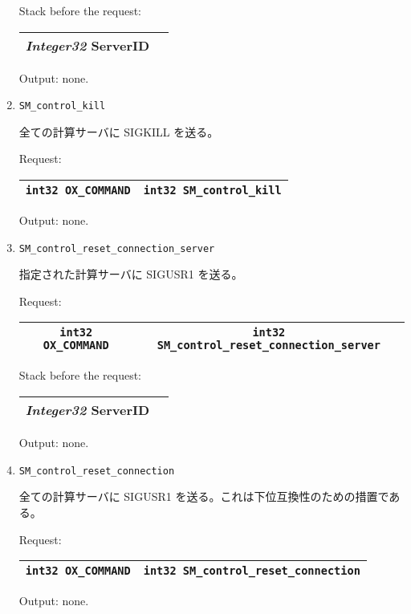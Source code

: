 \documentclass{article}
\begin{document}
\begin{enumerate}
Stack before the request:
\begin{tabular}{|c|c|}  \hline
{\sl Integer32} ServerID \\
\hline
\end{tabular}

Output: none.

\item
\begin{verbatim}
SM_control_kill
\end{verbatim}
全ての計算サーバに SIGKILL を送る。

Request:
\begin{tabular}{|c|c|}  \hline
{\tt int32 OX\_COMMAND} & {\tt int32 SM\_control\_kill}  \\
\hline
\end{tabular}

Output: none.

\item
\begin{verbatim}
SM_control_reset_connection_server
\end{verbatim}
指定された計算サーバに SIGUSR1 を送る。

Request:
\begin{tabular}{|c|c|}  \hline
{\tt int32 OX\_COMMAND} & {\tt int32 SM\_control\_reset\_connection\_server}  \\
\hline
\end{tabular}

Stack before the request:
\begin{tabular}{|c|c|}  \hline
{\sl Integer32} ServerID \\
\hline
\end{tabular}

Output: none.

\item
\begin{verbatim}
SM_control_reset_connection
\end{verbatim}
全ての計算サーバに SIGUSR1 を送る。これは下位互換性のための措置である。

Request:
\begin{tabular}{|c|c|}  \hline
{\tt int32 OX\_COMMAND} & {\tt int32 SM\_control\_reset\_connection}  \\
\hline
\end{tabular}

Output: none.

\end{enumerate}

\bigskip
\bigskip
\end{document}
